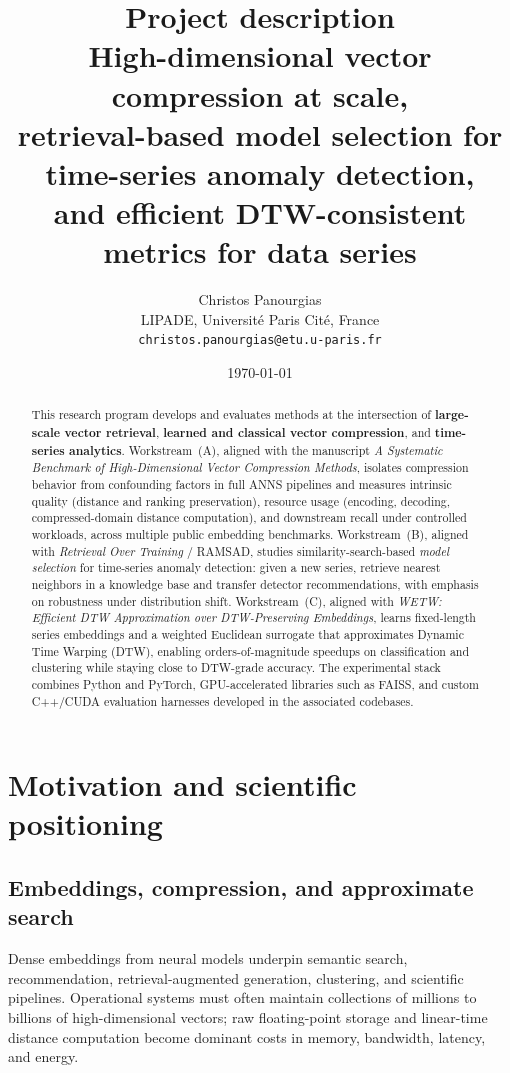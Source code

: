 \documentclass[11pt,a4paper]{article}
\title{\textbf{Project description}\\
\large High-dimensional vector compression at scale,\\
retrieval-based model selection for time-series anomaly detection,\\
and efficient DTW-consistent metrics for data series}
\author{Christos Panourgias\\
  LIPADE, Université Paris Cité, France\\
  \texttt{christos.panourgias@etu.u-paris.fr}}
\date{\today}
\begin{document}
\maketitle

\begin{abstract}
This research program develops and evaluates methods at the intersection of \textbf{large-scale vector retrieval}, \textbf{learned and classical vector compression}, and \textbf{time-series analytics}. Workstream~(A), aligned with the manuscript \textit{A Systematic Benchmark of High-Dimensional Vector Compression Methods}, isolates compression behavior from confounding factors in full ANNS pipelines and measures intrinsic quality (distance and ranking preservation), resource usage (encoding, decoding, compressed-domain distance computation), and downstream recall under controlled workloads, across multiple public embedding benchmarks. Workstream~(B), aligned with \textit{Retrieval Over Training} / \textsc{RAMSAD}, studies similarity-search-based \emph{model selection} for time-series anomaly detection: given a new series, retrieve nearest neighbors in a knowledge base and transfer detector recommendations, with emphasis on robustness under distribution shift. Workstream~(C), aligned with \textit{WETW: Efficient DTW Approximation over DTW-Preserving Embeddings}, learns fixed-length series embeddings and a weighted Euclidean surrogate that approximates Dynamic Time Warping (DTW), enabling orders-of-magnitude speedups on classification and clustering while staying close to DTW-grade accuracy. The experimental stack combines Python and PyTorch, GPU-accelerated libraries such as FAISS, and custom C++/CUDA evaluation harnesses developed in the associated codebases.
\end{abstract}

\section{Motivation and scientific positioning}

\subsection{Embeddings, compression, and approximate search}
Dense embeddings from neural models underpin semantic search, recommendation, retrieval-augmented generation, clustering, and scientific pipelines. Operational systems must often maintain collections of millions to billions of high-dimensional vectors; raw floating-point storage and linear-time distance computation become dominant costs in memory, bandwidth, latency, and energy.
\end{document}
